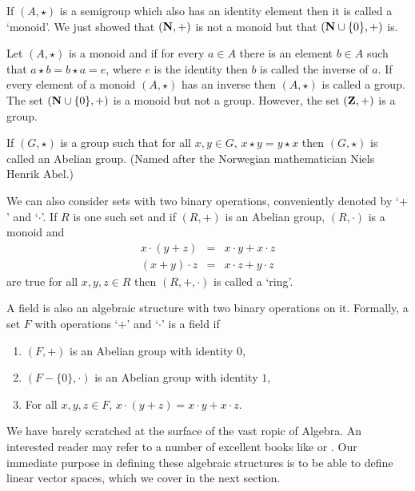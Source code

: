 If $(A, \star)$ is a semigroup which also has an identity element then it is
called a `monoid'. We just showed that $(\mathbf{N}, +)$ is not a monoid but that
$(\mathbf{N} \cup \{0\}, +)$ is.

Let $(A, \star)$ is a monoid and if for every $a \in A$ there is an element
$b \in A$ such that $a \star b = b \star a = e$, where $e$ is the identity then
$b$ is called the inverse of $a$. If every element of a monoid $(A, \star)$ 
has an inverse then $(A, \star)$ is called a group. The set $(\mathbf{N} \cup \{0\},
+)$ is a monoid but not a group. However, the set $(\mathbf{Z}, +)$ is a group.

If $(G, \star)$ is a group such that for all $x, y \in G$, $x \star y = 
y \star x$ then $(G, \star)$ is called an Abelian group. (Named after the 
Norwegian mathematician Niels Henrik Abel.)

We can also consider sets with two binary operations, conveniently denoted by 
`$+$' and `$\cdot$'. If $R$ is one such set and if $(R, +)$ is an Abelian
group, $(R, \cdot)$ is a monoid and
\begin{eqnarray*}
x\cdot(y + z) &=& x\cdot y + x \cdot z \\
(x + y)\cdot z&=& x\cdot z + y \cdot z
\end{eqnarray*}
are true for all $x, y, z \in R$ then $(R, +, \cdot)$ is called a `ring'.

A field is also an algebraic structure with two binary operations on it. 
Formally, a set $F$ with operations `$+$' and `$\cdot$' is a field if
\begin{enumerate}
\item $(F, +)$ is an Abelian group with identity $0$,
\item $(F - \{0\}, \cdot)$ is an Abelian group with identity $1$,
\item For all $x, y, z \in F$, $x\cdot(y+z) = x\cdot y + x\cdot z$.
\end{enumerate}

We have barely scratched at the surface of the vast ropic of Algebra. An
interested reader may refer to a number of excellent books like 
\cite{herstein2006topics} or \cite{lang2002graduate}. Our immediate purpose
in defining these algebraic structures is to be able to define linear vector
spaces, which we cover in the next section.

